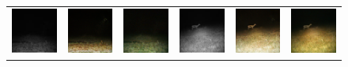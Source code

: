 \begin{figure}[htp!]
\begin{tabularx}{\textwidth}{>{\centering\arraybackslash}X >{\centering\arraybackslash}X >{\centering\arraybackslash}X >{\centering\arraybackslash}X >{\centering\arraybackslash}X >{\centering\arraybackslash}X}
        \includegraphics{gfx/conditional-diffusion-sampling-qual/nir_S2_B06_R3_PICT3848.jpg} & \includegraphics{gfx/conditional-diffusion-sampling-qual/cyclegan_S2_B06_R3_PICT3848_fake.png} & \includegraphics{gfx/conditional-diffusion-sampling-qual/diffusion_S2_B06_R3_PICT3848.png} & \includegraphics{gfx/conditional-diffusion-sampling-qual/nir_S2_B07_R1_PICT3274.jpg} & \includegraphics{gfx/conditional-diffusion-sampling-qual/cyclegan_S2_B07_R1_PICT3274_fake.png} & \includegraphics{gfx/conditional-diffusion-sampling-qual/diffusion_S2_B07_R1_PICT3274.png}

\end{tabularx}
\end{figure}
